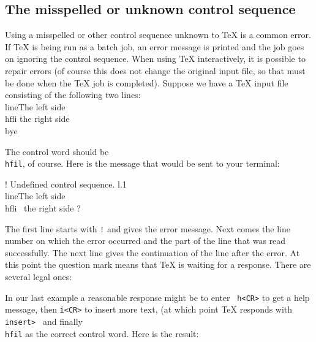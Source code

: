 \subsection{The misspelled or unknown control sequence} 
 
Using a misspelled or other control sequence unknown to \TeX{} is 
a common error.  If \TeX{} is being run as a batch job, an error 
message is printed and the job goes on ignoring the control 
sequence.  When using \TeX{} interactively, it is possible to 
repair errors (of course this does not change the original input 
file, so that must be done when the \TeX{} job is completed). 
Suppose we have a \TeX{} input file consisting of the following 
two lines: 
\beginuser 
\\line\lb The left side \\hfli the right side\rb 
\\bye 
\enduser 
 
The control word should be {\tt \\hfil}, of course. Here is the 
message that would be sent to your terminal: 
 
\beginuser 
\obeyspaces 
! Undefined  control sequence. 
l.1 \\line\lb The left side \\hfli 
\                               the right side\rb 
? 
\enduser 
 
The first line starts with {\tt !} and gives the error message. 
Next comes the line number on which the error occurred and the 
part of the line that was read successfully.  The next line gives 
the continuation of the line after the error. At this point the 
question mark means that \TeX{} is waiting for a response.  There 
are several legal ones: 
\nobreak 
{} 
 
In our last example a reasonable response might be to enter {\tt 
h<CR>} to get a help message, then {\tt i<CR>} to insert more 
text, (at which point \TeX{} responds with {\tt insert> } and 
finally {\tt \\hfil} as the correct control word.  Here is the 
result: 
 
